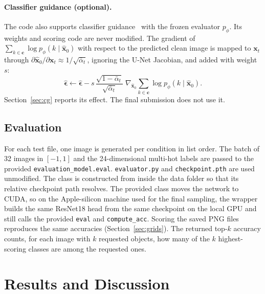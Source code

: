 \documentclass[11pt]{article}
\newcommand{\abar}{\bar{\alpha}}
\newcommand{\eps}{\boldsymbol{\epsilon}}
\newcommand{\x}{\mathbf{x}}
\newcommand{\cvec}{\mathbf{c}}
\begin{document}
\paragraph{Classifier guidance (optional).}
The code also supports classifier guidance~\cite{dhariwal2021} with the frozen evaluator
$p_\phi$. Its weights and scoring code are never modified. The gradient of
$\sum_{k\in\cvec}\log p_\phi(k\mid\hat{\x}_0)$ with respect to the predicted clean image is
mapped to $\x_t$ through $\partial\hat{\x}_0/\partial\x_t\approx 1/\sqrt{\abar_t}$, ignoring
the U-Net Jacobian, and added with weight $s$:
\begin{equation}
\hat{\eps}\leftarrow\hat{\eps}-s\,\frac{\sqrt{1-\abar_t}}{\sqrt{\abar_t}}\;\nabla_{\hat{\x}_0}\sum_{k\in\cvec}\log p_\phi(k\mid\hat{\x}_0).
\end{equation}
Section~\ref{sec:cg} reports its effect. The final submission does not use it.

\subsection{Evaluation}
For each test file, one image is generated per condition in list order. The batch of 32
images in $[-1,1]$ and the 24-dimensional multi-hot labels are passed to the provided
\texttt{evaluation\_model.eval}. \texttt{evaluator.py} and \texttt{checkpoint.pth} are
used unmodified. The class is constructed from inside the data folder so that its
relative checkpoint path resolves. The provided class moves the network to CUDA, so on
the Apple-silicon machine used for the final sampling, the wrapper builds the same
ResNet18 head from the same checkpoint on the local GPU and still calls the provided
\texttt{eval} and \texttt{compute\_acc}. Scoring the saved PNG files reproduces the same
accuracies (Section~\ref{sec:grids}). The returned top-$k$ accuracy counts, for each image
with $k$ requested objects, how many of the $k$ highest-scoring classes are among the
requested ones.

\section{Results and Discussion}\label{sec:results}
\end{document}
